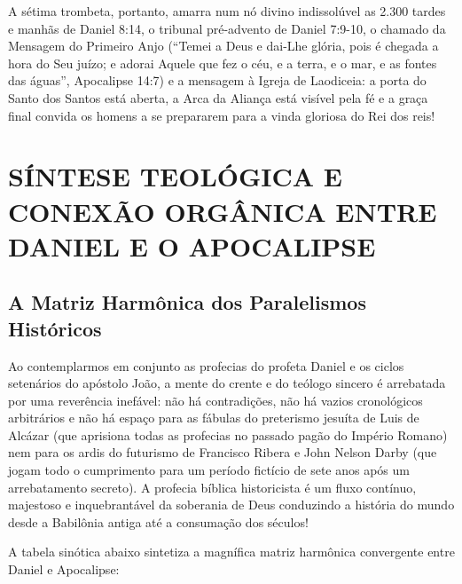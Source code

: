 \documentclass[11pt,a4paper,openany]{book}
\begin{document}
A sétima trombeta, portanto, amarra num nó divino indissolúvel as 2.300 tardes e manhãs de Daniel 8:14, o tribunal pré-advento de Daniel 7:9-10, o chamado da Mensagem do Primeiro Anjo (``Temei a Deus e dai-Lhe glória, pois é chegada a hora do Seu juízo; e adorai Aquele que fez o céu, e a terra, e o mar, e as fontes das águas'', Apocalipse 14:7) e a mensagem à Igreja de Laodiceia: a porta do Santo dos Santos está aberta, a Arca da Aliança está visível pela fé e a graça final convida os homens a se prepararem para a vinda gloriosa do Rei dos reis!


\section{SÍNTESE TEOLÓGICA E CONEXÃO ORGÂNICA ENTRE DANIEL E O APOCALIPSE}



\subsection{A Matriz Harmônica dos Paralelismos Históricos}


Ao contemplarmos em conjunto as profecias do profeta Daniel e os ciclos setenários do apóstolo João, a mente do crente e do teólogo sincero é arrebatada por uma reverência inefável: não há contradições, não há vazios cronológicos arbitrários e não há espaço para as fábulas do preterismo jesuíta de Luis de Alcázar (que aprisiona todas as profecias no passado pagão do Império Romano) nem para os ardis do futurismo de Francisco Ribera e John Nelson Darby (que jogam todo o cumprimento para um período fictício de sete anos após um arrebatamento secreto).
A profecia bíblica historicista é um fluxo contínuo, majestoso e inquebrantável da soberania de Deus conduzindo a história do mundo desde a Babilônia antiga até a consumação dos séculos!

A tabela sinótica abaixo sintetiza a magnífica matriz harmônica convergente entre Daniel e Apocalipse:
\end{document}
